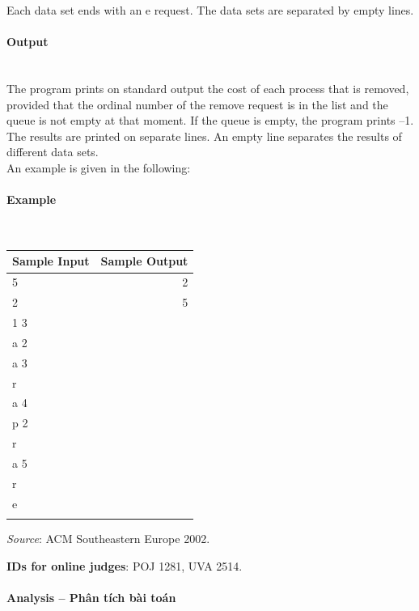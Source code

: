 \documentclass{article}
\begin{document}
Each data set ends with an e request. The data sets are separated by empty lines.

\paragraph{Output}\mbox{} \\

The program prints on standard output the cost of each process that is removed, provided that the
ordinal number of the remove request is in the list and the queue is not empty at that moment. If
the queue is empty, the program prints –1. The results are printed on separate lines. An empty line
separates the results of different data sets.\\
An example is given in the following:

\paragraph{Example}\mbox{} \\

\begin{table}[h]
    \centering
    \begin{tabular}{|l|r|}
        \hline
        \textbf{Sample Input} & \textbf{Sample Output} \\
        \hline
        5    & 2  \\ 
        2    &  5 \\ 
        1 3    &  \\ 
        a 2    &  \\ 
        a 3    &  \\
		r &  \\ 
		a 4&  \\ 
		p 2&  \\ 
		r &  \\ 
		a 5&  \\ 
		r &  \\ 
		e &  \\
            &  \\ \hline
    \end{tabular}
\end{table}

\textit{Source}: ACM Southeastern Europe 2002.

\textbf{IDs for online judges}: POJ 1281, UVA 2514.


\paragraph{Analysis -- Phân tích bài toán} \mbox{} \\
\end{document}
